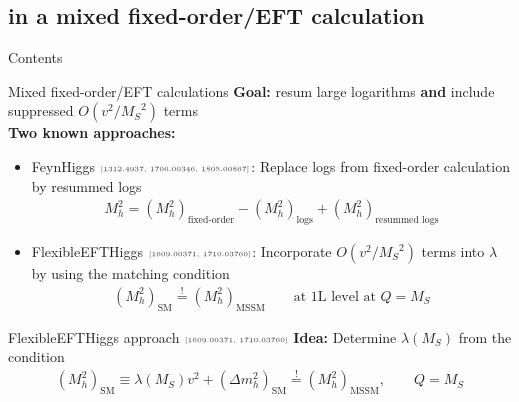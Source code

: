 \documentclass[hyperref={pdfpagelabels=false},ngerman]{beamer}
\newcommand{\MS}{\ensuremath{M_S}}
\newcommand{\mycite}[1]{\ensuremath{\text{\textcolor{darkgray}{\tiny [#1]}}}}
\renewcommand{\emph}{\textbf}
\newcommand{\SM}{\ensuremath{\text{SM}}}
\newcommand{\MSSM}{\ensuremath{\text{MSSM}}}
\begin{document}

\subsection{in a mixed fixed-order/EFT calculation}

\begin{frame}{Contents}
  \tableofcontents[
  currentsection,
  currentsubsection,
  subsectionstyle=show/shaded/hide]  
\end{frame}

\begin{frame}{Mixed fixed-order/EFT calculations}
  \emph{Goal:} resum large logarithms \emph{and} include suppressed
  $O(v^2/\MS^2)$ terms
  \\[2em]
  \emph{Two known approaches:}
  \begin{itemize}
  \item FeynHiggs \mycite{1312.4937, 1706.00346, 1805.00867}: Replace logs from
    fixed-order calculation by resummed logs
    \begin{align*}
      M_h^2 = (M_h^2)_{\text{fixed-order}} - (M_h^2)_{\text{logs}} + (M_h^2)_{\text{resummed logs}}
    \end{align*}
  \item FlexibleEFTHiggs \mycite{1609.00371, 1710.03760}: Incorporate
    $O(v^2/\MS^2)$ terms into $\lambda$ by using the matching
    condition
    \begin{align*}
      (M_h^2)_{\SM} \overset{!}{=} (M_h^2)_{\MSSM} \qquad \text{at 1L level at } Q = \MS
    \end{align*}
  \end{itemize}
\end{frame}

\begin{frame}{FlexibleEFTHiggs approach \mycite{1609.00371, 1710.03760}}
  \emph{Idea:}
  Determine $\lambda(\MS)$ from the condition
  \begin{align*}
    (M_h^2)_{\SM} \equiv \lambda(\MS) v^2 + (\Delta m_h^2)_{\SM} \overset{!}{=} (M_h^2)_{\MSSM} , \qquad Q = \MS
  \end{align*}
  \begin{center}
  \end{center}
\end{frame}
\end{document}
